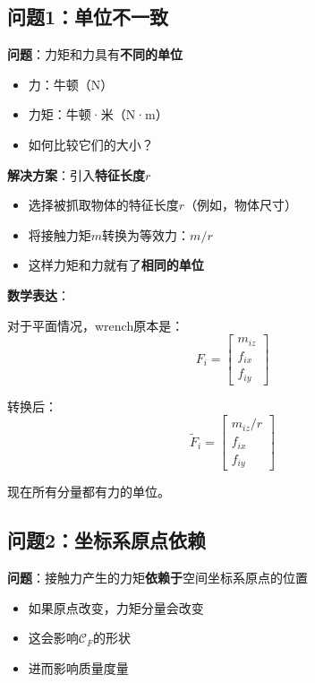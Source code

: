 \documentclass[12pt,a4paper]{article}
\begin{document}
\subsection{问题1：单位不一致}

\textbf{问题}：力矩和力具有\textbf{不同的单位}

\begin{itemize}
\item 力：牛顿（N）
\item 力矩：牛顿·米（N·m）
\item 如何比较它们的大小？
\end{itemize}

\textbf{解决方案}：引入\textbf{特征长度}$r$

\begin{itemize}
\item 选择被抓取物体的特征长度$r$（例如，物体尺寸）
\item 将接触力矩$m$转换为等效力：$m/r$
\item 这样力矩和力就有了\textbf{相同的单位}
\end{itemize}

\textbf{数学表达}：

对于平面情况，wrench原本是：
\begin{equation}
F_i = \begin{bmatrix} m_{iz} \\ f_{ix} \\ f_{iy} \end{bmatrix}
\end{equation}

转换后：
\begin{equation}
\tilde{F}_i = \begin{bmatrix} m_{iz}/r \\ f_{ix} \\ f_{iy} \end{bmatrix}
\end{equation}

现在所有分量都有力的单位。

\subsection{问题2：坐标系原点依赖}

\textbf{问题}：接触力产生的力矩\textbf{依赖于}空间坐标系原点的位置

\begin{itemize}
\item 如果原点改变，力矩分量会改变
\item 这会影响$\mathcal{C}_F$的形状
\item 进而影响质量度量
\end{itemize}
\end{document}
